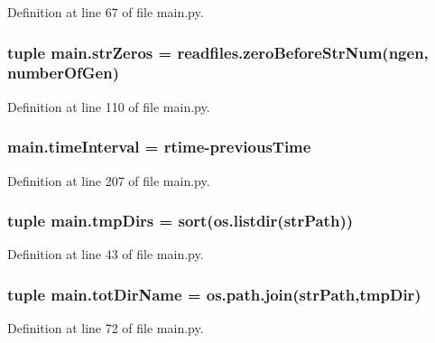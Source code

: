 Definition at line 67 of file main.\-py.

\hypertarget{a00151_a02d59015bebcf0ad1bc1162efca757c3}{
\subsubsection[{str\-Zeros}]{\setlength{\rightskip}{0pt plus 5cm}tuple main.\-str\-Zeros = readfiles.\-zero\-Before\-Str\-Num(ngen, {\bf number\-Of\-Gen})}}\label{a00151_a02d59015bebcf0ad1bc1162efca757c3}


Definition at line 110 of file main.\-py.

\hypertarget{a00151_a5ba0cd0b7538ed8047b2fea322ecb4b7}{
\subsubsection[{time\-Interval}]{\setlength{\rightskip}{0pt plus 5cm}main.\-time\-Interval = {\bf rtime}-\/{\bf previous\-Time}}}\label{a00151_a5ba0cd0b7538ed8047b2fea322ecb4b7}


Definition at line 207 of file main.\-py.

\hypertarget{a00151_a9606754176252315321d1faa6191479e}{
\subsubsection[{tmp\-Dirs}]{\setlength{\rightskip}{0pt plus 5cm}tuple main.\-tmp\-Dirs = sort(os.\-listdir({\bf str\-Path}))}}\label{a00151_a9606754176252315321d1faa6191479e}


Definition at line 43 of file main.\-py.

\hypertarget{a00151_a82f73a786e4c93e909fd689ee0d0812e}{
\subsubsection[{tot\-Dir\-Name}]{\setlength{\rightskip}{0pt plus 5cm}tuple main.\-tot\-Dir\-Name = os.\-path.\-join({\bf str\-Path},tmp\-Dir)}}\label{a00151_a82f73a786e4c93e909fd689ee0d0812e}


Definition at line 72 of file main.\-py.

